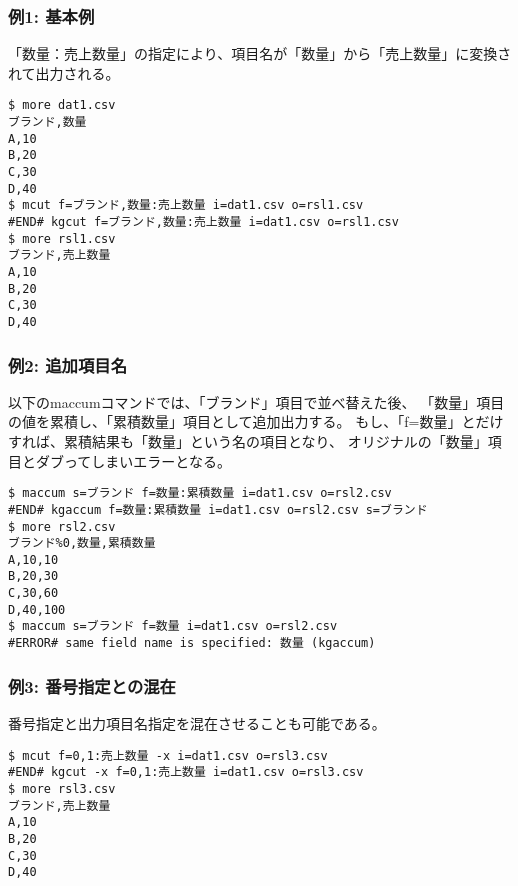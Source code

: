 \subsubsection*{例1: 基本例}

「数量：売上数量」の指定により、項目名が「数量」から「売上数量」に変換されて出力される。


\begin{Verbatim}[baselinestretch=0.7,frame=single]
$ more dat1.csv
ブランド,数量
A,10
B,20
C,30
D,40
$ mcut f=ブランド,数量:売上数量 i=dat1.csv o=rsl1.csv
#END# kgcut f=ブランド,数量:売上数量 i=dat1.csv o=rsl1.csv
$ more rsl1.csv
ブランド,売上数量
A,10
B,20
C,30
D,40
\end{Verbatim}
\subsubsection*{例2: 追加項目名}

以下のmaccumコマンドでは、「ブランド」項目で並べ替えた後、
「数量」項目の値を累積し、「累積数量」項目として追加出力する。
もし、「f=数量」とだけすれば、累積結果も「数量」という名の項目となり、
オリジナルの「数量」項目とダブってしまいエラーとなる。


\begin{Verbatim}[baselinestretch=0.7,frame=single]
$ maccum s=ブランド f=数量:累積数量 i=dat1.csv o=rsl2.csv
#END# kgaccum f=数量:累積数量 i=dat1.csv o=rsl2.csv s=ブランド
$ more rsl2.csv
ブランド%0,数量,累積数量
A,10,10
B,20,30
C,30,60
D,40,100
$ maccum s=ブランド f=数量 i=dat1.csv o=rsl2.csv
#ERROR# same field name is specified: 数量 (kgaccum)
\end{Verbatim}
\subsubsection*{例3: 番号指定との混在}

番号指定と出力項目名指定を混在させることも可能である。


\begin{Verbatim}[baselinestretch=0.7,frame=single]
$ mcut f=0,1:売上数量 -x i=dat1.csv o=rsl3.csv
#END# kgcut -x f=0,1:売上数量 i=dat1.csv o=rsl3.csv
$ more rsl3.csv
ブランド,売上数量
A,10
B,20
C,30
D,40
\end{Verbatim}

